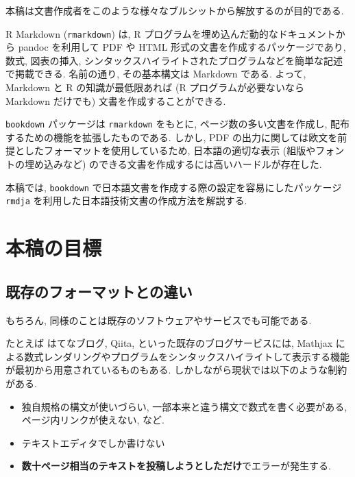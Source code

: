 \documentclass[
  nomag]{bxjsbook}
\providecommand{\tightlist}{%
  \setlength{\itemsep}{0pt}\setlength{\parskip}{0pt}}
\theoremstyle{definition}
\theoremstyle{definition}
\theoremstyle{definition}
\theoremstyle{remark}
\begin{document}
本稿は文書作成者をこのような様々なブルシットから解放するのが目的である.

R Markdown (\texttt{rmarkdown}) は, R
プログラムを埋め込んだ動的なドキュメントから pandoc を利用して PDF や
HTML 形式の文書を作成するパッケージであり, 数式, 図表の挿入,
シンタックスハイライトされたプログラムなどを簡単な記述で掲載できる.
名前の通り, その基本構文は Markdown である. よって, Markdown と R
の知識が最低限あれば (R プログラムが必要ないなら Markdown だけでも)
文書を作成することができる.

\texttt{bookdown} パッケージは \texttt{rmarkdown} をもとに,
ページ数の多い文書を作成し, 配布するための機能を拡張したものである.
しかし, PDF
の出力に関しては欧文を前提としたフォーマットを使用しているため,
日本語の適切な表示 (組版やフォントの埋め込みなど)
のできる文書を作成するには高いハードルが存在した.

本稿では, \texttt{bookdown}
で日本語文書を作成する際の設定を容易にしたパッケージ \texttt{rmdja}
を利用した日本語技術文書の作成方法を解説する.

\hypertarget{ux672cux7a3fux306eux76eeux6a19}{%
\chapter*{本稿の目標}\label{ux672cux7a3fux306eux76eeux6a19}}

\hypertarget{ux65e2ux5b58ux306eux30d5ux30a9ux30fcux30deux30c3ux30c8ux3068ux306eux9055ux3044}{%
\section*{既存のフォーマットとの違い}\label{ux65e2ux5b58ux306eux30d5ux30a9ux30fcux30deux30c3ux30c8ux3068ux306eux9055ux3044}}

もちろん, 同様のことは既存のソフトウェアやサービスでも可能である.

たとえば はてなブログ, Qiita, といった既存のブログサービスには, Mathjax
による数式レンダリングやプログラムをシンタックスハイライトして表示する機能が最初から用意されているものもある.
しかしながら現状では以下のような制約がある.

\begin{itemize}
\tightlist
\item
  独自規格の構文が使いづらい, 一部本来と違う構文で数式を書く必要がある,
  ページ内リンクが使えない, など.
\item
  テキストエディタでしか書けない
\item
  \textbf{数十ページ相当のテキストを投稿しようとしただけ}でエラーが発生する.
\end{itemize}
\end{document}
